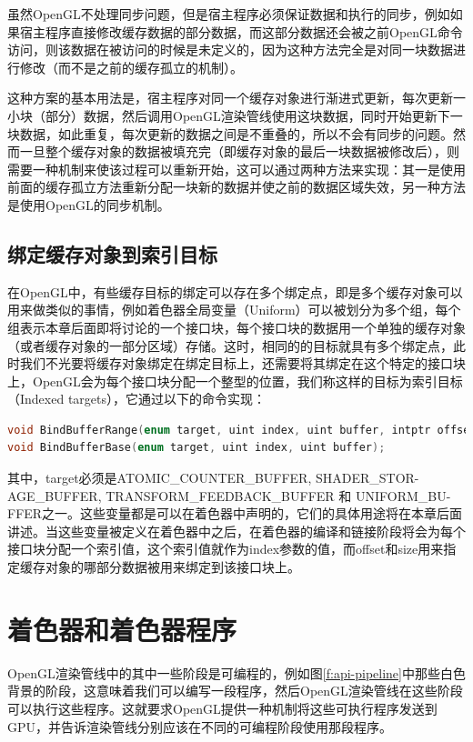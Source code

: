 虽然OpenGL不处理同步问题，但是宿主程序必须保证数据和执行的同步，例如如果宿主程序直接修改缓存数据的部分数据，而这部分数据还会被之前OpenGL命令访问，则该数据在被访问的时候是未定义的，因为这种方法完全是对同一块数据进行修改（而不是之前的缓存孤立的机制）。

这种方案的基本用法是，宿主程序对同一个缓存对象进行渐进式更新，每次更新一小块（部分）数据，然后调用OpenGL渲染管线使用这块数据，同时开始更新下一块数据，如此重复，每次更新的数据之间是不重叠的，所以不会有同步的问题。然而一旦整个缓存对象的数据被填充完（即缓存对象的最后一块数据被修改后），则需要一种机制来使该过程可以重新开始，这可以通过两种方法来实现：其一是使用前面的缓存孤立方法重新分配一块新的数据并使之前的数据区域失效，另一种方法是使用OpenGL的同步机制。





\subsection{绑定缓存对象到索引目标}\label{sec:api-indexed-target}
在OpenGL中，有些缓存目标的绑定可以存在多个绑定点，即是多个缓存对象可以用来做类似的事情，例如着色器全局变量（Uniform）可以被划分为多个组，每个组表示本章后面即将讨论的一个接口块，每个接口块的数据用一个单独的缓存对象（或者缓存对象的一部分区域）存储。这时，相同的的目标就具有多个绑定点，此时我们不光要将缓存对象绑定在绑定目标上，还需要将其绑定在这个特定的接口块上，OpenGL会为每个接口块分配一个整型的位置，我们称这样的目标为索引目标（Indexed targets），它通过以下的命令实现：

\begin{lstlisting}[language=C++]
void BindBufferRange(enum target, uint index, uint buffer, intptr offset, sizeiptr size);
void BindBufferBase(enum target, uint index, uint buffer);
\end{lstlisting}

其中，target必须是ATOMIC\_COUNTER\_BUFFER, SHADER\_STOR-\\AGE\_BUFFER, TRANSFORM\_FEEDBACK\_BUFFER 和 UNIFORM\_BU- FFER之一。这些变量都是可以在着色器中声明的，它们的具体用途将在本章后面讲述。当这些变量被定义在着色器中之后，在着色器的编译和链接阶段将会为每个接口块分配一个索引值，这个索引值就作为index参数的值，而offset和size用来指定缓存对象的哪部分数据被用来绑定到该接口块上。




\section{着色器和着色器程序}
OpenGL渲染管线中的其中一些阶段是可编程的，例如图\ref{f:api-pipeline}中那些白色背景的阶段，这意味着我们可以编写一段程序，然后OpenGL渲染管线在这些阶段可以执行这些程序。这就要求OpenGL提供一种机制将这些可执行程序发送到GPU，并告诉渲染管线分别应该在不同的可编程阶段使用那段程序。

